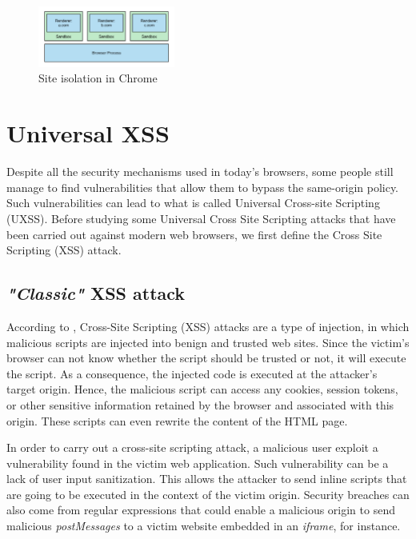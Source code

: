 \documentclass[journal]{IEEEtran}
\begin{document}
\begin{figure}[h]
\centering
\includegraphics[width=0.4\textwidth]{images/IsolationChrome.png}
\caption{Site isolation in Chrome}
\label{fig:ChromeIsolation}
\end{figure}

\section{Universal XSS}

Despite all the security mechanisms used in today's browsers, some people still manage to find vulnerabilities that allow them to bypass the same-origin policy. Such vulnerabilities can lead to what is called Universal Cross-site Scripting (UXSS).
Before studying some Universal Cross Site Scripting attacks that have been carried out against modern web browsers, we first define the Cross Site Scripting (XSS) attack.

\subsection{\emph{"Classic"} XSS attack}

According to \cite{owaspXSS}, Cross-Site Scripting (XSS) attacks are a type of injection, in which malicious scripts are injected into benign and trusted web sites.
Since the victim's browser can not know whether the script should be trusted or not, it will execute the script. As a consequence, the injected code is executed at the attacker's target origin. Hence, the malicious script can access any cookies, session tokens, or other sensitive information retained by the browser and associated with this origin. These scripts can even rewrite the content of the HTML page.

\bigskip


\bigskip

In order to carry out a cross-site scripting attack, a malicious user exploit a vulnerability found in the victim web application. Such vulnerability can be a lack of user input sanitization. This allows the attacker to send inline scripts that are going to be executed in the context of the victim origin. Security breaches can also come from regular expressions that could enable a malicious origin to send malicious \emph{postMessages}  \cite{postMessagesXSS} to a victim website embedded in an \emph{iframe}, for instance.
\end{document}
